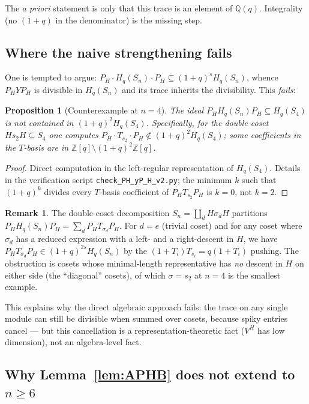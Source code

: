 \documentclass[11pt]{article}
\newtheorem{proposition}[theorem]{Proposition}
\theoremstyle{definition}
\newtheorem{remark}[theorem]{Remark}
\newcommand{\PH}{P_H}
\newcommand{\Hq}{H_q(S_n)}
\newcommand{\Z}{\mathbb{Z}}
\newcommand{\Q}{\mathbb{Q}}
\begin{document}
The \emph{a priori} statement is only that this trace is an element of
$\Q(q)$. Integrality (no $(1+q)$ in the denominator) is the missing step.

\subsection{Where the naive strengthening fails}

One is tempted to argue: $\PH\cdot\Hq\cdot\PH\subseteq(1+q)^s\Hq$, whence
$\PH Y\PH$ is divisible in $\Hq$ and its trace inherits the divisibility.
This \emph{fails}:

\begin{proposition}[Counterexample at $n=4$]\label{prop:counter}
The ideal $\PH\Hq\PH\subseteq H_q(S_4)$ is not contained in
$(1+q)^2 H_q(S_4)$. Specifically, for the double coset
$Hs_2H\subseteq S_4$ one computes
$\PH\cdot T_{s_2}\cdot\PH\notin(1+q)^2 H_q(S_4)$; some coefficients in the
$T$-basis are in $\Z[q]\setminus(1+q)^2\Z[q]$.
\end{proposition}

\begin{proof}
Direct computation in the left-regular representation of $H_q(S_4)$.
Details in the verification script \texttt{check\_PH\_yP\_H\_v2.py};
the minimum $k$ such that $(1+q)^k$ divides every $T$-basis coefficient
of $\PH T_{s_2}\PH$ is $k=0$, not $k=2$.
\end{proof}

\begin{remark}
The double-coset decomposition $S_n=\coprod_d H\sigma_d H$ partitions
$\PH\Hq\PH=\sum_d\PH T_{\sigma_d}\PH$. For $d=e$ (trivial coset) and for
any coset where $\sigma_d$ has a reduced expression with a left- and a
right-descent in $H$, we have
$\PH T_{\sigma_d}\PH\in(1+q)^{2s}\Hq$ by the
$(1+T_i)T_{s_i}=q(1+T_i)$ pushing. The obstruction is cosets whose
minimal-length representative has \emph{no} descent in $H$ on either side
(the ``diagonal'' cosets), of which $\sigma=s_2$ at $n=4$ is the
smallest example.

This explains why the direct algebraic approach fails: the trace on any
single module can still be divisible when summed over cosets, because
spiky entries cancel --- but this cancellation is a representation-theoretic
fact ($V^H$ has low dimension), not an algebra-level fact.
\end{remark}

\subsection{Why Lemma~\ref{lem:APHB} does not extend to $n\ge 6$}
\end{document}
